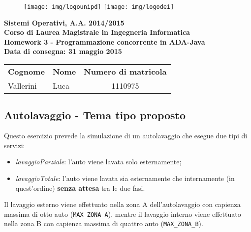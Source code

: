\documentclass[a4paper]{scrartcl}
\newcommand{\corso}{Sistemi Operativi}
\newcommand{\anac}{ A.A. 2014/2015}
\newcommand{\laurea}{Corso di Laurea Magistrale in Ingegneria Informatica}
\newcommand{\matricola}{1110975}
\newcommand{\nome}{Luca}
\newcommand{\cognome}{Vallerini}
\newcommand{\data}{Data di consegna: 31 maggio 2015}
\newcommand{\consegna}{Homework 3 - Programmazione concorrente in ADA-Java}
\begin{document}
\begin{figure}
	\begin{minipage}[t]{\textwidth}
		\texttt{[image: img/logounipd]}
		\hfill
		\texttt{[image: img/logodei]}
	\end{minipage}
\end{figure}

{

\vspace{5pt}
\centering
\textbf{\corso ,\anac} \\
\textbf{\laurea} \\
\vspace{15pt}
\textbf{\consegna} \\
\textbf{\small\data}


\vspace{5pt}
\begin{table}[h]
	\begin{tabularx}{\textwidth}{|X|X|c|}
		\hline
		\multicolumn{1}{|c|}{\textbf{Cognome}} &
		\multicolumn{1}{c|}{\textbf{Nome}} &
		\multicolumn{1}{c|}{\textbf{Numero di matricola}} \\
		\centering\cognome &
		\centering\nome &
		\matricola \\
		\hline
	\end{tabularx}
\end{table}

}

\subsection*{Autolavaggio - Tema tipo proposto}
Questo esercizio prevede la simulazione di un autolavaggio che esegue due tipi di servizi:
\begin{itemize}
\item \textit{lavaggioParziale}: l'auto viene lavata solo esternamente;
\item \textit{lavaggioTotale}: l'auto viene lavata sia esternamente che internamente (in quest'ordine) \textbf{senza attesa} tra le due fasi.
\end{itemize}

Il lavaggio esterno viene effettuato nella zona A dell'autolavaggio con capienza massima di otto auto (\texttt{MAX\_{ZONA}\_{A}}), mentre il lavaggio interno viene effettuato nella zona B con capienza massima di quattro auto (\texttt{MAX\_{ZONA}\_{B}}).
\end{document}
